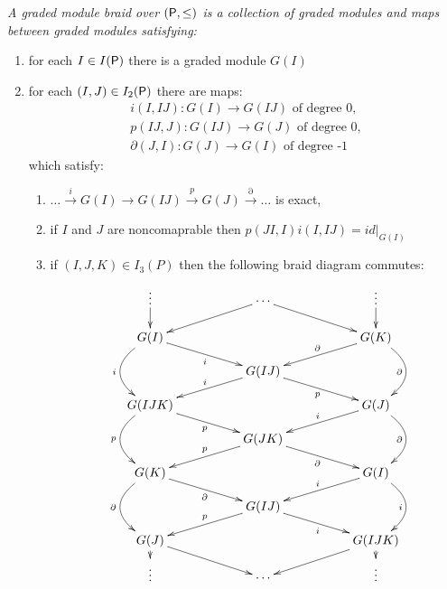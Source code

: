 \begin{defn}
{\em
A {\em graded module braid} over $({\mathsf P},\leq)$ is a collection of graded modules and maps between graded modules satisfying:
\begin{enumerate}
\item for each $I\in I({\mathsf P})$ there is a graded module $G(I)$
\item for each $(I,J)\in I_2({\mathsf P})$ there are maps:
\begin{align*}
i(I,IJ):G(I)\to G(IJ) \text{ of degree 0,}\\
p(IJ,J):G(IJ)\to G(J) \text{ of degree 0,}\\
\partial(J,I):G(J)\to G(I) \text{ of degree -1}
\end{align*}
which satisfy:
\begin{enumerate}
\item $\ldots \xrightarrow{i} G(I)\to G(IJ)\xrightarrow{p} G(J) \xrightarrow{\partial} \ldots$ is exact,
\item if $I$ and $J$ are noncomaprable then $p(JI,I)i(I,IJ)=id|_{G(I)}$
\item if $(I,J,K)\in I_3(P)$ then the following braid diagram commutes:
\[
\xymatrixrowsep{0.15in}
\xymatrixcolsep{0.3in}
\xymatrix{
\vdots \ar@{->}[d] && \cdots \ar@{->}[drr] \ar@{->}[dll] && \vdots \ar@{->}[d]\\
G(I)\ar@/_2pc/[dd]_{i} \ar@{->}[drr]_{i} &&  && G(K)\ar@{->}[dll]_{\partial} \ar@/^2pc/[dd]_{\partial}  \\
& &G(IJ) \ar@{->}[dll]_{i} \ar@{->}[drr]_{p} &&\\
G(IJK) \ar@/_2pc/[dd]_{p}  \ar@{->}[drr]_{p} &&  && G(J)\ar@{->}[dll]_{i}  \ar@/^2pc/[dd]_{\partial}  \\
& &G(JK) \ar@{->}[dll]_{p} \ar@{->}[drr]_{\partial} &&\\
G(K)\ar@/_2pc/[dd]_{\partial}    \ar@{->}[drr]_{\partial} &&  && G(I)\ar@{->}[dll]_{i}   \ar@/^2pc/[dd]_{i} \\
& &G(IJ) \ar@{->}[dll]_{p} \ar@{->}[drr]_{i} &&\\
G(J)\ar@{->}[d] \ar@{->}[drr] &&  && G(IJK)\ar@{->}[dll]  \ar@{->}[d] \\
\vdots && \cdots && \vdots}
\] 
\end{enumerate}

\end{enumerate}
}
\end{defn}

